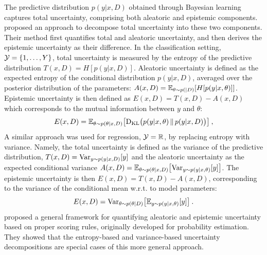 The predictive distribution $p(y|x,D)$ obtained through Bayesian learning captures total uncertainty, comprising both aleatoric and epistemic components. \cite{Depeweg-Decompos-ICML2018} proposed an approach to decompose total uncertainty into these two components. Their method first quantifies total and aleatoric uncertainty, and then derives the epistemic uncertainty as their difference.
In the classification setting, ${\cal Y}=\{1,\ldots,Y\}$, total uncertainty is measured by the entropy of the predictive distribution $T(x,D)=H[p(y|x,D)]$. Aleatoric uncertainty is defined as the expected entropy of the conditional distribution $p(y|x,D)$, averaged over the posterior distribution of the parameters: $A(x,D)={\mathbb{E}}_{\theta\sim p(|D)}[H[p(y|x,\theta)]]$. Epistemic uncertainty is then defined as $E(x,D) = T(x,D) - A(x,D)$  which corresponds to the mutual information between $y$ and $\theta$:
\begin{equation}
\label{equ:EntropyBaseDecomposition}
  E(x,D) = {\mathbb{E}}_{\theta\sim p(\theta|x,D)} \big [{\rm D}_{\rm KL}\big (p(y|x,\theta)\, \|\, p(y|x,D)\big ) \big ] \:,
\end{equation}
%
%
A similar approach was used for regression, ${\cal Y}=\mathbb{R}$, by replacing entropy with variance. Namely, the total uncertainty is defined as the variance of the predictive distribution, $T(x,D)={\rm Var}_{y \sim p(y \mid x, D)} [y]$ and the aleatoric uncertainty as the expected conditional variance $A(x,D) = {\mathbb{E}}_{\theta \sim p(\theta \mid x,D)} \big [ {\rm Var}_{y \sim p(y \mid x, \theta)}[y] \big ]$. The epistemic uncertainty is then $E(x,D) = T(x,D) - A(x,D)$, corresponding to the variance of the conditional mean w.r.t. to model parameters:
\begin{equation}
\label{equ:VarianceBaseDecomposition}
  E(x,D) = {\rm Var}_{\theta\sim p(\theta|D)} \big [ {\mathbb{E}}_{y\sim p(y|x,\theta)}[y] \big ] \:.
\end{equation}
%
\cite{Hofman-QuantifAleatoricEpistemic-Arxiv2024} proposed a general framework for quantifying aleatoric and epistemic uncertainty based on proper scoring rules, originally developed for probability estimation. They showed that the entropy-based and variance-based uncertainty decompositions are special cases of this more general approach.

